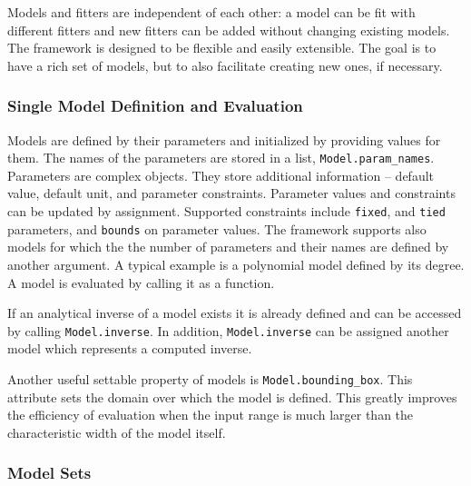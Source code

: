 \documentclass[modern]{aastex61}
\newcommand{\package}[1]{\texttt{#1}\xspace}
\newcommand{\inlinecomment}[2]{\todo[inline]{#1: #2}\xspace}
\begin{document}
Models and fitters are independent of each other: a model can be fit with different
fitters and new fitters can be added without changing existing models. The
framework is designed to be flexible and easily extensible. The goal is to have
a rich set of models, but to also facilitate creating new ones, if necessary.


\subsubsection{Single Model Definition and Evaluation}


Models are defined by their parameters and initialized by providing values for them. The
names of the parameters are stored in a list, \texttt{Model.param\_names}. Parameters are complex objects.
They store additional information -- default value, default unit, and parameter constraints. Parameter
values and constraints can be updated by assignment. Supported constraints include \texttt{fixed},
and \texttt{tied} parameters, and \texttt{bounds} on parameter values. The framework supports also models
for which the the number of parameters and their names are defined by another argument.
A typical example is a polynomial model defined by its degree.
A model is evaluated by calling it as a function.

If an analytical inverse of a model exists it is already defined and can be
accessed  by calling \texttt{Model.inverse}. In addition, \texttt{Model.inverse} can be assigned
another model which represents a computed inverse.

Another useful settable property of models is \texttt{Model.bounding\_box}. This attribute sets the domain over which the model is defined. This greatly improves the efficiency of evaluation when the input range is much larger than the characteristic width of the model itself.

\subsubsection{Model Sets}
\end{document}
